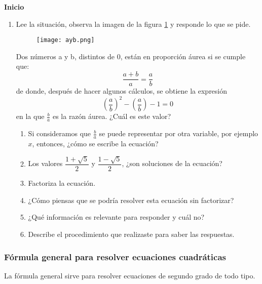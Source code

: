 \begin{boxK}
    \begin{center}\textbf{Inicio}\end{center}
    \begin{enumerate}
        \item Lee la situación, observa la imagen de la figura \ref{fig:ayb} y responde lo que se pide.
              \begin{figure}[H]
                  \centering
                  \texttt{[image: ayb.png]}
                  \label{fig:ayb}
              \end{figure}
              \begin{boxF}
                  Dos números a y b, distintos de 0, están en proporción áurea si se cumple que:
                  \[\dfrac{a + b}{a}=\dfrac{a}{b}\]
                  de donde, después de hacer algunos cálculos, se obtiene la expresión
                  \[ \left(\dfrac{a}{b}\right)^2-\left(\dfrac{a}{b}\right)-1=0\]
                  en la que $\frac{b}{a}$ es la razón áurea. ¿Cuál es este valor?
              \end{boxF}
              \begin{enumerate}
                  \item Si consideramos que $\frac{b}{a}$ se puede representar por otra variable, por ejemplo $x$, entonces, ¿cómo se escribe la ecuación?
                  \item Los valores $\dfrac{1+\sqrt{5}}{2}$ y $\dfrac{1-\sqrt{5}}{2}$, ¿son soluciones de la ecuación?
                  \item Factoriza la ecuación.
                  \item ¿Cómo piensas que se podría resolver esta ecuación sin factorizar?
                  \item ¿Qué información es relevante para responder y cuál no?
                  \item Describe el procedimiento que realizaste para saber las respuestas.
              \end{enumerate}
    \end{enumerate}
\end{boxK}

\subsubsection{Fórmula general para resolver ecuaciones cuadráticas}
La fórmula general sirve para resolver ecuaciones de segundo grado de todo tipo.

